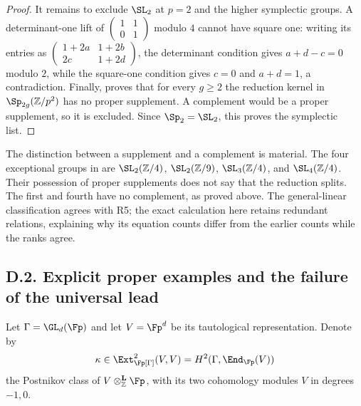 \begin{proof}
It remains to exclude $\SL_2$ at $p=2$ and the higher symplectic groups.  A determinant-one lift of $\left(\begin{smallmatrix}1&1\\0&1\end{smallmatrix}\right)$ modulo $4$ cannot have square one: writing its entries as $\left(\begin{smallmatrix}1+2a&1+2b\\2c&1+2d\end{smallmatrix}\right)$, the determinant condition gives $a+d-c=0$ modulo $2$, while the square-one condition gives $c=0$ and $a+d=1$, a contradiction.  Finally, \cite[Theorem~2.5]{DetinkoFlanneryHulpke2018} proves that for every $g\geq2$ the reduction kernel in $\Sp_{2g}(\mathbb Z/p^2)$ has no proper supplement.  A complement would be a proper supplement, so it is excluded.  Since $\Sp_2=\SL_2$, this proves the symplectic list.
\end{proof}

\begin{remark}
The distinction between a supplement and a complement is material.  The four exceptional groups in \cite[Theorem~2.5]{DetinkoFlanneryHulpke2018} are $\SL_2(\mathbb Z/4)$, $\SL_2(\mathbb Z/9)$, $\SL_3(\mathbb Z/4)$, and $\SL_4(\mathbb Z/4)$.  Their possession of proper supplements does not say that the reduction splits.  The first and fourth have no complement, as proved above.  The general-linear classification agrees with R5; the exact calculation here retains redundant relations, explaining why its equation counts differ from the earlier counts while the ranks agree.
\end{remark}

\subsection{D.2. Explicit proper examples and the failure of the universal lead}

Let $\Gamma=\GL_d(\Fp)$ and let $V=\Fp^d$ be its tautological representation.  Denote by
\[
 \kappa\in\Ext^2_{\Fp[\Gamma]}(V,V)
       =H^2(\Gamma,\End_{\Fp}(V))
\]
the Postnikov class of $V\otimes^{\mathbf L}_{\mathbb Z}\Fp$, with its two cohomology modules $V$ in degrees $-1,0$.

